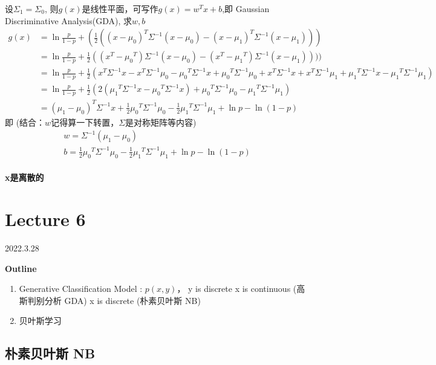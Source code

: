 \documentclass[UTF8]{ctexart}
\begin{document}
设$ \Sigma_1=\Sigma_0 $, 则$g(x)$是线性平面，可写作$g(x) = w^Tx+b$,即 Gaussian Discriminative Analysis(GDA),
求$w, b$
\begin{equation*}
    \begin{aligned}
        g(x) &= \ln{\frac{p}{1-p}} + (\frac{1}{2}((x-\mu_0)^T\Sigma^{-1}(x-\mu_0)-(x-\mu_1)^T\Sigma^{-1}(x-\mu_1))) \\
        & = \ln{\frac{p}{1-p}} + \frac{1}{2}((x^T-{\mu_0}^T)\Sigma^{-1}(x-\mu_0) - (x^T-{\mu_1}^T)\Sigma^{-1}(x-\mu_1))))\\
        &= \ln{\frac{p}{1-p}} + \frac{1}{2}(x^T \Sigma^{-1}x - x^T\Sigma^{-1}\mu_0 - {\mu_0}^T\Sigma^{-1}x + {\mu_0}^T\Sigma^{-1}\mu_0 + x^T \Sigma^{-1}x + x^T\Sigma^{-1}\mu_1 + {\mu_1}^T\Sigma^{-1}x - {\mu_1}^T\Sigma^{-1}\mu_1) \\
        &= \ln{\frac{p}{1-p}} + \frac{1}{2}(2({\mu_1}^T \Sigma^{-1}x - {\mu_0}^T \Sigma^{-1}x) + {\mu_0}^T\Sigma^{-1}\mu_0 - {\mu_1}^T\Sigma^{-1}\mu_1) \\
        &= ({{\mu_1}-{\mu_0}})^T\Sigma^{-1}x + \frac{1}{2}{\mu_0}^T\Sigma^{-1}\mu_0 - \frac{1}{2}{\mu_1}^T\Sigma^{-1}\mu_1 + \ln p - \ln{(1-p)} 
    \end{aligned}
\end{equation*}
即 (结合：$w$记得算一下转置，$\Sigma$是对称矩阵等内容)
\begin{gather*}
    w = \Sigma^{-1}({{\mu_1}-{\mu_0}})\\
    b = \frac{1}{2}{\mu_0}^T\Sigma^{-1}\mu_0 - \frac{1}{2}{\mu_1}^T\Sigma^{-1}\mu_1 + \ln p - \ln{(1-p)}  
\end{gather*}

\paragraph*{x是离散的}

\newpage
\section{Lecture 6}
2022.3.28


\textbf{Outline}
\begin{enumerate}
    \item Generative Classification Model : $p(x,y)$， y is discrete
        \subitem x is continuous (高斯判别分析 GDA)
        \subitem x is discrete (朴素贝叶斯 NB)
    \item 贝叶斯学习
\end{enumerate}

\subsection{朴素贝叶斯 NB}
\dotfill
\end{document}
